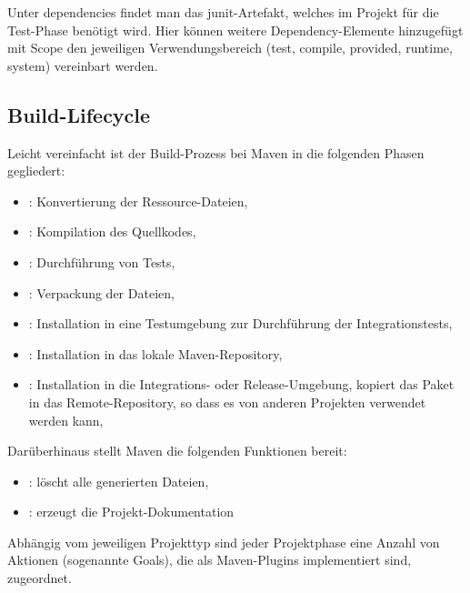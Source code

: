 Unter dependencies findet man
das junit-Artefakt, welches im Projekt für die Test-Phase
benötigt wird. Hier können weitere Dependency-Elemente
hinzugefügt mit Scope den jeweiligen Verwendungsbereich
 (test, compile, provided, runtime, system) vereinbart werden.
%
%
\newslide
\subsection{Build-Lifecycle}
Leicht vereinfacht ist der Build-Prozess bei Maven
in die folgenden Phasen gegliedert:
\begin{itemize}
\item {}: Konvertierung der Ressource-Dateien,
\item {}: Kompilation des Quellkodes,
\item {}: Durchführung von Tests,
\item {}: Verpackung der Dateien,
\item {}: Installation in eine Testumgebung zur
  Durchführung der Integrationstests,
\newslide
\item {}: Installation in das lokale Maven-Repository,
\item {}: Installation in die Integrations-
                        oder Release-Umgebung,
 kopiert das Paket in das  Remote-Repository, so dass es von anderen
 Projekten verwendet werden kann,
\end{itemize}
%
Darüberhinaus stellt Maven die folgenden Funktionen bereit:
\begin{itemize}
\item {}: löscht alle generierten Dateien,
\item {}: erzeugt die Projekt-Dokumentation
\end{itemize}
\newslide
Abhängig vom jeweiligen Projekttyp
 sind jeder Projektphase eine Anzahl
von Aktionen (sogenannte Goals),
die als Maven-Plugins implementiert sind, zugeordnet.

